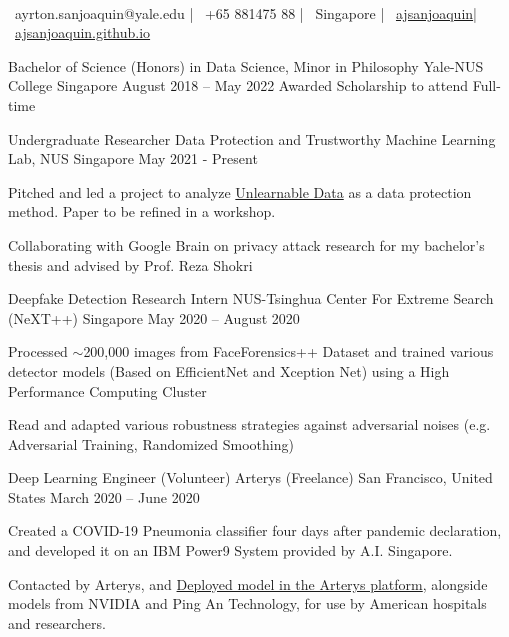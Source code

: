 \documentclass[]{awesome-cv}
\begin{document}
    
\begin{center}
	 \  \\
	{\faEnvelope\ ayrton.sanjoaquin@yale.edu} | {\faMobile\ +65 881475 88} | {\faMapMarker\ Singapore} | {\faLinkedinSquare\ \href{https://www.linkedin.com/in/ajsanjoaquin/}{ajsanjoaquin}}| {\faLink\ \href{http://ajsanjoaquin.github.io/}{ajsanjoaquin.github.io}}
\end{center}
\begin{cventries}
	\cventry
	{Bachelor of Science (Honors) in Data Science, Minor in Philosophy}
	{Yale-NUS College}
	{Singapore}
	{August 2018 – May 2022}
	{Awarded Scholarship to attend Full-time}
	\cventry
\end{cventries}
\vspace{-8mm}
\begin{cventries}
	\cventry
	{Undergraduate Researcher}
	{Data Protection and Trustworthy Machine Learning Lab, NUS}
	{Singapore}
	{May 2021 - Present}
	{\begin{cvitems}
		\item {Pitched and led a project to analyze \href{https://arxiv.org/abs/2101.04898}{Unlearnable Data} as a data protection method. Paper to be refined in a workshop.}
		\item {Collaborating with Google Brain on privacy attack research for my bachelor's thesis and advised by Prof. Reza Shokri}
		\end{cvitems}}
	\cventry
	{Deepfake Detection Research Intern}
	{NUS-Tsinghua Center For Extreme Search (NeXT++)}
	{Singapore}
	{May 2020 – August 2020}
	{\begin{cvitems}
		\item {Processed $\sim$200,000 images from FaceForensics++ Dataset and trained various detector models (Based on EfficientNet and Xception Net) using a High Performance Computing Cluster}
		\item {Read and adapted various robustness strategies against adversarial noises (e.g. Adversarial Training, Randomized Smoothing)}
		\end{cvitems}}
	\cventry
	{Deep Learning Engineer (Volunteer)}
	{Arterys (Freelance)}
	{San Francisco, United States}
	{March 2020 – June 2020}
	{\begin{cvitems}
		\item {Created a COVID-19 Pneumonia classifier four days after pandemic declaration, and developed it on an IBM Power9 System provided by A.I. Singapore.}
		\item {Contacted by Arterys, and \href{https://marketplace.arterys.com/model/ayrtoncovidXR}{Deployed model in the Arterys platform}, 
		alongside models from NVIDIA and Ping An Technology, for use by American hospitals and researchers.}
		\end{cvitems}}
\end{cventries}
\end{document}
